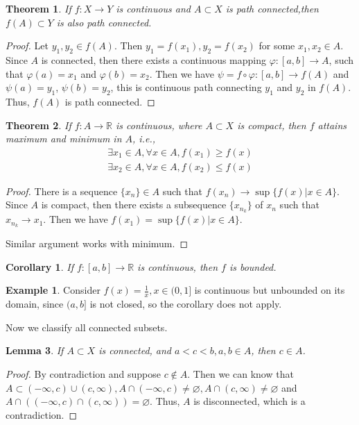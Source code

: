 \documentclass[12pt,leqno]{amsart}
\newtheorem{theorem}{Theorem}[section]
\newtheorem{corollary}{Corollary}[theorem]
\newtheorem{lemma}[theorem]{Lemma}
\theoremstyle{definition}
\newtheorem{example}{Example}[section]
\numberwithin{equation}{subsection}
\begin{document}
\begin{theorem}
If $f:X\to Y$ is continuous and $A\subset X$ is path connected,then $f(A)\subset Y$ is also path connected.
\end{theorem}
\begin{proof}
Let $y_1, y_2\in f(A)$. Then $y_1 = f(x_1), y_2 = f(x_2)$ for some $x_1, x_2\in A$. Since $A$ is connected, then there exists a continuous mapping $\varphi:[a,b]\to A$, such that $\varphi(a) = x_1$ and $\varphi(b) = x_2$. Then we have $\psi = f\circ \varphi: [a,b]\to f(A)$ and $\psi(a) = y_1$, $\psi(b) = y_2$, this is continuous path connecting $y_1$ and $y_2$ in $f(A)$. Thus, $f(A)$ is path connected.
\end{proof}

\begin{theorem}
If $f:A\to \mathbb{R}$ is continuous, where $A\subset X$ is compact, then $f$ attains maximum and minimum in $A$, i.e.,
\begin{align*}
    \exists x_1\in A, \forall x\in A, f(x_1)\geq f(x) \\
    \exists x_2\in A, \forall x\in A, f(x_2)\leq f(x)
\end{align*}
\end{theorem}
\begin{proof}
There is a sequence $\{x_n\}\in A$ such that $f(x_n)\to \sup\{f(x)|x\in A\}$. Since $A$ is compact, then there exists a subsequence $\{x_{n_k}\}$ of $x_n$ such that $x_{n_k}\to x_1$. Then we have $f(x_1) = \sup\{f(x)|x\in A\}$. 

Similar argument works with minimum.
\end{proof}

\begin{corollary}
If $f:[a,b]\to \mathbb{R}$ is continuous, then $f$ is bounded.
\end{corollary}

\medskip

\begin{example}
Consider $f(x) = \frac{1}{x}, x\in (0,1]$ is continuous but unbounded on its domain, since $(a,b]$ is not closed, so the corollary does not apply.
\end{example}

\medskip

Now we classify all connected subsets. 

\begin{lemma}\label{inter_value_connected}
If $A\subset X$ is connected, and $a<c<b, a,b\in A$, then $c\in A$.
\end{lemma}
\begin{proof}
By contradiction and suppose $c\notin A$. Then we can know that $A\subset (-\infty,c)\cup(c,\infty), A\cap (-\infty,c)\neq\varnothing, A\cap (c,\infty)\neq\varnothing$ and $A\cap((-\infty,c)\cap(c,\infty)) = \varnothing$. Thus, $A$ is disconnected, which is a contradiction.
\end{proof}
\end{document}
